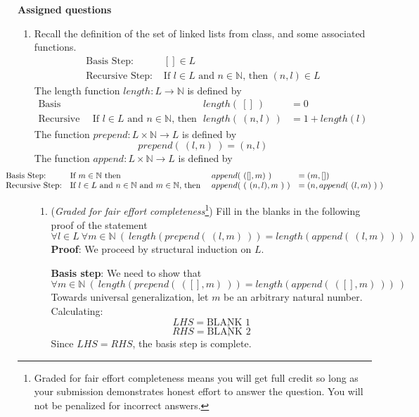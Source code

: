 \newpage
{\bf Assigned questions}

\begin{enumerate}
    \item Recall the definition of the set of linked lists from class, and some associated functions.
    \[
        \begin{array}{ll}
        \textrm{Basis Step: } & [] \in L \\
        \textrm{Recursive Step: } & \textrm{If } l \in L\textrm{ and }n \in \mathbb{N} \textrm{, then } (n, l) \in L
        \end{array}
    \]
    The length function $length: L \to \mathbb{N}$ is defined by
    \[
        \begin{array}{llll}
        \textrm{Basis Step:} &  & length(~[]~) &= 0 \\
        \textrm{Recursive Step:} & \textrm{If } l \in L\textrm{ and }n \in \mathbb{N}\textrm{, then  } & length(~(n, l)~)  &= 1+ length(l)
        \end{array}
    \]
    The function $prepend : L \times \mathbb{N} \to L$ is defined by
    \[
        prepend(~(l, n)~) = (n, l)
    \]
    The function $append : L \times \mathbb{N} \to L$ is defined by
    \[
    \hspace{-40pt}\begin{array}{llll}
    \textrm{Basis Step:} & \textrm{If } m \in \mathbb{N}\textrm{ then } & append(~([], m)~) & = (m, []) \\
    \textrm{Recursive Step:} & \textrm{If } l \in L\textrm{ and }n \in \mathbb{N}\textrm{ and }m \in \mathbb{N}\textrm{, then  } & append(~(~(n, l), m~)~) &= (n, append(~(l, m)~)~)
    \end{array}
    \]
    \begin{enumerate}
        \item ({\it Graded for fair effort completeness}\footnote{Graded for fair effort completeness means 
        you will get full credit so long as your submission demonstrates honest 
        effort to answer the question. You will not be penalized for incorrect answers.}) Fill in the blanks in the following proof of the statement
        \[
            \forall l\in L~ \forall m \in \mathbb{N} ~(~length(prepend(~(l,m)~)) = length(append(~(l,m)~))~)
        \]
        {\bf Proof}: We proceed by structural induction on $L$.
        
        {\bf Basis step}: We need to show that 
        \[
            \forall m \in \mathbb{N}  ~(~length(prepend(~([],m)~)) = length(append(~([],m)~))~)
        \]
        Towards universal generalization, let $m$ be an arbitrary natural number. Calculating:
        \[
            LHS = \underline{\text{BLANK~1}}
        \]
        \[
            RHS = \underline{\text{BLANK~2}}
        \]
        Since $LHS = RHS$, the basis step is complete.


\end{enumerate}
\end{enumerate}

